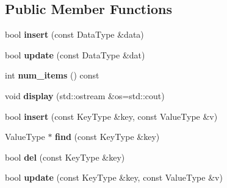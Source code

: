 \subsection*{Public Member Functions}
\begin{CompactItemize}
\item 
\hypertarget{classcccr__hash_9f0e0f8eaf7370e7417e2fbaed88d6e6}{
bool \textbf{insert} (const DataType \&data)}
\label{classcccr__hash_9f0e0f8eaf7370e7417e2fbaed88d6e6}

\item 
\hypertarget{classcccr__hash_a4587ac348bd2b65186e5bddedd7c6a2}{
bool \textbf{update} (const DataType \&dat)}
\label{classcccr__hash_a4587ac348bd2b65186e5bddedd7c6a2}

\item 
\hypertarget{classcccr__hash_d9f201209fc37cc23afba5b07f47dbde}{
int \textbf{num\_\-items} () const }
\label{classcccr__hash_d9f201209fc37cc23afba5b07f47dbde}

\item 
\hypertarget{classcccr__hash_eddc7b7680bd29a9a17f859f291fd2da}{
void \textbf{display} (std::ostream \&os=std::cout)}
\label{classcccr__hash_eddc7b7680bd29a9a17f859f291fd2da}

\item 
\hypertarget{classcccr__hash_4016ceeb1d7fdbcb1b94132f838682f9}{
bool \textbf{insert} (const KeyType \&key, const ValueType \&v)}
\label{classcccr__hash_4016ceeb1d7fdbcb1b94132f838682f9}

\item 
\hypertarget{classcccr__hash_07d730bb1bf0c5eee4d82f1646432b30}{
ValueType $\ast$ \textbf{find} (const KeyType \&key)}
\label{classcccr__hash_07d730bb1bf0c5eee4d82f1646432b30}

\item 
\hypertarget{classcccr__hash_9a442ea53d9e4b6d429f54e6742a40be}{
bool \textbf{del} (const KeyType \&key)}
\label{classcccr__hash_9a442ea53d9e4b6d429f54e6742a40be}

\item 
\hypertarget{classcccr__hash_c5980ff3a6f52b8fcedd586598ca360b}{
bool \textbf{update} (const KeyType \&key, const ValueType \&v)}
\label{classcccr__hash_c5980ff3a6f52b8fcedd586598ca360b}

\end{CompactItemize}
